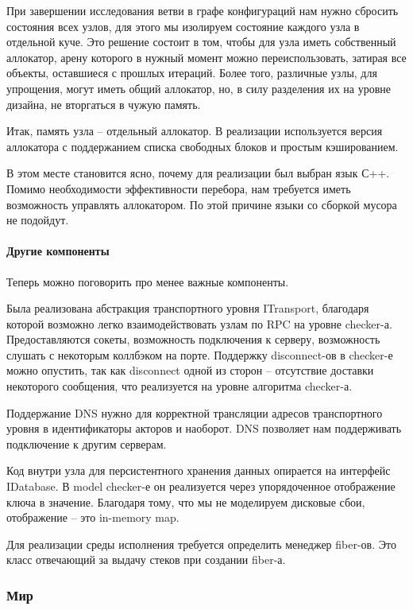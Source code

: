 При завершении исследования ветви в графе конфигураций нам нужно сбросить состояния всех узлов, для этого мы изолируем состояние каждого узла в отдельной куче. Это решение состоит в том, чтобы для узла иметь собственный аллокатор, арену которого в нужный момент можно переиспользовать, затирая все объекты, оставшиеся с прошлых итераций. Более того, различные узлы, для упрощения, могут иметь общий аллокатор, но, в силу разделения их на уровне дизайна, не вторгаться в чужую память.

Итак, память узла – отдельный аллокатор. В реализации используется версия аллокатора с поддержанием списка свободных блоков и простым кэшированием.

В этом месте становится ясно, почему для реализации был выбран язык С++. Помимо необходимости эффективности перебора, нам требуется иметь возможность управлять аллокатором. По этой причине языки со сборкой мусора не подойдут.

\paragraph{Другие компоненты}\mbox{}

Теперь можно поговорить про менее важные компоненты.

Была реализована абстракция транспортного уровня ITransport, благодаря которой возможно легко взаимодействовать узлам по RPC на уровне checker-а. Предоставляются сокеты, возможность подключения к серверу, возможность слушать с некоторым коллбэком на порте. Поддержку disconnect-ов в checker-е можно опустить, так как disconnect одной из сторон – отсутствие доставки некоторого сообщения, что реализуется на уровне алгоритма checker-а.

Поддержание DNS нужно для корректной трансляции адресов транспортного уровня в идентификаторы акторов и наоборот. DNS позволяет нам поддерживать подключение к другим серверам.

Код внутри узла для персистентного хранения данных опирается на интерфейс IDatabase. В model checker-е он реализуется через упорядоченное отображение ключа в значение. Благодаря тому, что мы не моделируем дисковые сбои, отображение – это in-memory map.

Для реализации среды исполнения требуется определить менеджер fiber-ов. Это класс отвечающий за выдачу стеков при создании fiber-а.

\subsubsection{Мир}

